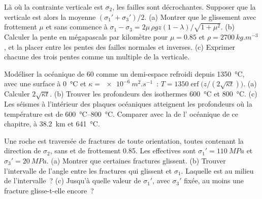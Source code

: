 \begin{exercise}[$\star\star\star$]\label{exo:b1:stress-strain-rheology:10}
Là où la contrainte verticale est $\sigma_2$, les failles sont décrochantes. Supposer que
la  verticale est alors la moyenne $(\sigma_1' + \sigma_3')/2$.
(a) Montrer que le glissement avec frottement $\mu$ et sans  commence à
$\sigma_1 - \sigma_3 = 2\mu\,\rho g z(1-\lambda)/\sqrt{1+\mu^2}$. (b) Calculer
la pente en mégapascals par kilomètre pour $\mu = 0.85$ et
$\rho = \qty{2700}{kg.m^{-3}}$, et la placer entre les pentes des failles normales et
inverses. (c) Exprimer chacune des trois pentes comme un multiple de la
 verticale.
\end{exercise}

\begin{exercise}[$\star\star\star$]\label{exo:b1:stress-strain-rheology:11}
Modéliser la  océanique de \qty{60}{\Ma} comme un demi-espace refroidi depuis
\qty{1350}{\degreeCelsius}, avec une surface à \qty{0}{\degreeCelsius} et
$\kappa = \qty{e-6}{m^2.s^{-1}}$~: $T = \num{1350}\operatorname{erf}\bigl(z/(2\sqrt{\kappa t})\bigr)$.
(a) Calculer $2\sqrt{\kappa t}$. (b) Trouver les profondeurs des isothermes
\qty{600}{\degreeCelsius} et \qty{800}{\degreeCelsius}. (c) Les séismes
à l'intérieur des plaques océaniques atteignent les profondeurs où la température est de
\qtyrange{600}{800}{\degreeCelsius}. Comparer avec la  de
l' océanique de ce chapitre, à
\qty{38.2}{km} et \qty{641}{\degreeCelsius}.
\end{exercise}

\begin{exercise}[$\star\star\star$]\label{exo:b1:stress-strain-rheology:12}
Une roche est traversée de fractures de toute orientation, toutes contenant la
direction de $\sigma_2$, sans  et de frottement 0.85. Les 
effectives sont $\sigma_1' = \qty{110}{MPa}$ et
$\sigma_3' = \qty{20}{MPa}$. (a) Montrer que certaines fractures glissent. (b) Trouver
l'intervalle de l'angle entre les fractures qui glissent et $\sigma_1$. Laquelle est
au milieu de l'intervalle~? (c) Jusqu'à quelle valeur de $\sigma_1'$, avec
$\sigma_3'$ fixée, au moins une fracture glisse-t-elle encore~?
\end{exercise}


